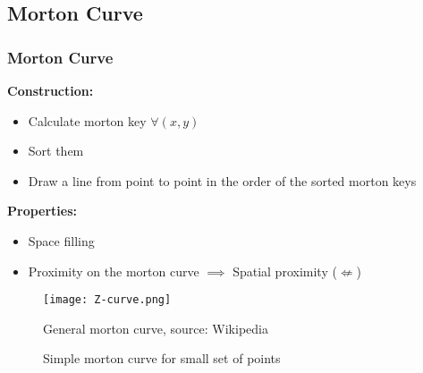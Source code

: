 \subsection{Morton Curve}
\begin{frame}
    \frametitle{Morton Curve}
    \textbf{Construction:}
    \begin{itemize}
        \item Calculate morton key $\forall \left(x, y\right)$ \\
        \item Sort them \\
        \item Draw a line from point to point in the order of the sorted morton
            keys
    \end{itemize}
    \textbf{Properties:}
    \begin{itemize}
        \item Space filling \\
        \item Proximity on the morton curve $\implies$ Spatial proximity
            ($\nLeftarrow$)
    \end{itemize}
\end{frame}

\begin{frame}
    \begin{figure}
        \centering
        \texttt{[image: Z-curve.png]}
        \caption{General morton curve, source: Wikipedia}
    \end{figure}
\end{frame}

\begin{frame}
    \begin{figure}
        \centering
        \resizebox{.8\textwidth}{!}{%
            
        }
        \caption{Simple morton curve for small set of points}
    \end{figure}
\end{frame}

